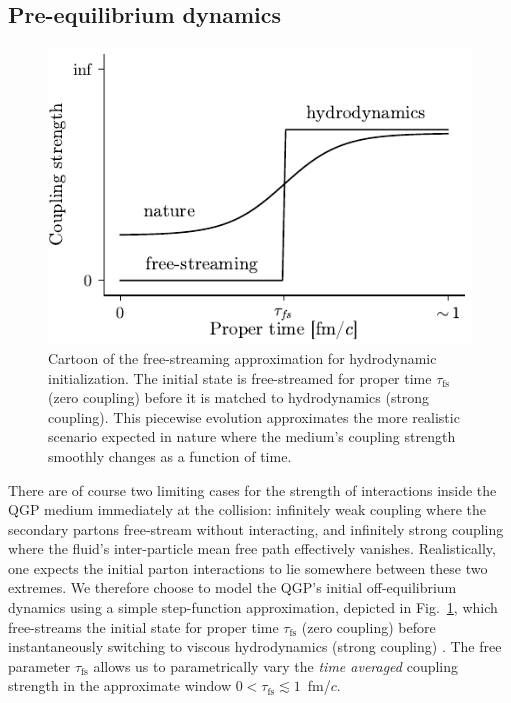 \documentclass[aps,prc,reprint,amsmath,nofootinbib]{revtex4-1}
\newcommand{\taufs}{\tau_\text{fs}}
\begin{document}
\subsection{Pre-equilibrium dynamics}

\begin{figure}[b]
  \includegraphics{coupling}
  \caption{Cartoon of the free-streaming approximation for hydrodynamic initialization. The initial state is free-streamed for proper time $\taufs$ (zero coupling) before it is matched to hydrodynamics (strong coupling). This piecewise evolution approximates the more realistic scenario expected in nature where the medium's coupling strength smoothly changes as a function of time.}
  \label{fig:coupling}
\end{figure}

There are of course two limiting cases for the strength of interactions inside the QGP medium immediately at the collision: infinitely weak coupling where the secondary partons free-stream without interacting, and infinitely strong coupling where the fluid's inter-particle mean free path effectively vanishes.
Realistically, one expects the initial parton interactions to lie somewhere between these two extremes.
We therefore choose to model the QGP's initial off-equilibrium dynamics using a simple step-function approximation, depicted in Fig.~\ref{fig:coupling}, which free-streams the initial state for proper time $\taufs$ (zero coupling) before instantaneously switching to viscous hydrodynamics (strong coupling) \cite{Liu:2015nwa, Broniowski:2008qk}.
The free parameter $\taufs$ allows us to parametrically vary the \emph{time averaged} coupling strength in the approximate window $0 < \taufs \lesssim1$~fm/$c$.
\end{document}
